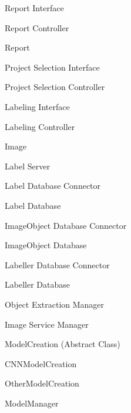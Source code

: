 \documentclass[12pt, titlepage]{article}
\newcounter{mnum}
\newcommand{\mthemnum}{M\themnum}
\begin{document}
\begin{description}
Report Interface
\item [\refstepcounter{mnum} \mthemnum \label{rc}:]
Report Controller
\item [\refstepcounter{mnum} \mthemnum \label{report}:]
Report
\item [\refstepcounter{mnum} \mthemnum \label{psi}:]
Project Selection Interface
\item [\refstepcounter{mnum} \mthemnum \label{psc}:]
Project Selection Controller
\item [\refstepcounter{mnum} \mthemnum \label{lbli}:]
Labeling Interface
\item [\refstepcounter{mnum} \mthemnum \label{lblc}:]
Labeling Controller
\item [\refstepcounter{mnum} \mthemnum \label{image}:]
Image

\item [\refstepcounter{mnum} \mthemnum \label{label server}:] Label Server
\item [\refstepcounter{mnum} \mthemnum \label{label database connector}:] Label Database Connector
\item [\refstepcounter{mnum} \mthemnum \label{label database}:] Label Database
\item [\refstepcounter{mnum} \mthemnum \label{ImageObject database connector}:] ImageObject Database Connector
\item [\refstepcounter{mnum} \mthemnum \label{ImageObject database}:] ImageObject Database
\item [\refstepcounter{mnum} \mthemnum \label{Labeller database connector}:] Labeller Database Connector
\item [\refstepcounter{mnum} \mthemnum \label{Labeller database}:] Labeller Database
\item [\refstepcounter{mnum} \mthemnum \label{Object Extraction Manager}:]Object Extraction Manager
\item [\refstepcounter{mnum} \mthemnum \label{Image Service Manager}:]Image Service Manager
\item [\refstepcounter{mnum} \mthemnum \label{modelcreation}:]
    ModelCreation (Abstract Class)

  \item [\refstepcounter{mnum} \mthemnum \label{cnnmodelcreation}:]
    CNNModelCreation

  \item [\refstepcounter{mnum} \mthemnum \label{othermodelcreation}:]
    OtherModelCreation

  \item [\refstepcounter{mnum} \mthemnum \label{modelmanager}:]
    ModelManager


\end{description}
\end{document}
